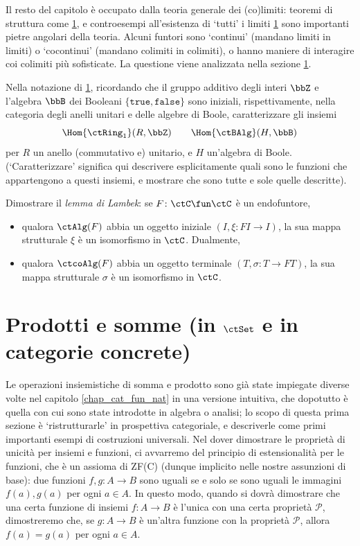 Il resto del capitolo è occupato dalla teoria generale dei (co)limiti: teoremi di struttura come \ref{}, e controesempi all'esistenza di `tutti' i limiti \ref{} sono importanti pietre angolari della teoria. Alcuni funtori sono `continui' (mandano limiti in limiti) o `cocontinui' (mandano colimiti in colimiti), o hanno maniere di interagire coi colimiti più sofisticate. La questione viene analizzata nella sezione \ref{}.
\begin{esercizi}
	\item \label{ex_21_1} Nella notazione di \ref{}, ricordando che il gruppo additivo degli interi \(\bbZ\) e l'algebra \(\bbB\) dei Booleani \(\{\texttt{true},\texttt{false}\}\) sono iniziali, rispettivamente, nella categoria degli anelli unitari e delle algebre di Boole, caratterizzare gli insiemi
	\[\Hom{\ctRing_1}(R,\bbZ) \qquad \Hom{\ctBAlg}(H,\bbB)\]
	per \(R\) un anello (commutativo e) unitario, e \(H\) un'algebra di Boole. (`Caratterizzare' significa qui descrivere esplicitamente quali sono le funzioni che appartengono a questi insiemi, e mostrare che sono tutte e sole quelle descritte).
	\item \label{ex_21_2} Dimostrare il \emph{lemma di Lambek}: se \(F \colon \ctC \fun\ctC\) è un endofuntore,
	\begin{itemize}
		\item qualora \(\ctAlg(F)\) abbia un oggetto iniziale \((I,\xi \colon FI \to I)\), la sua mappa strutturale \(\xi\) è un isomorfismo in \(\ctC\). Dualmente,
		\item qualora \(\ctcoAlg(F)\) abbia un oggetto terminale \((T,\sigma \colon T \to FT)\), la sua mappa strutturale \(\sigma\) è un isomorfismo in \(\ctC\).
	\end{itemize}
	\item \label{ex_21_3}
	\item \label{ex_21_4}
	\item \label{ex_21_5}
\end{esercizi}
\section{Prodotti e somme (in \(\ctSet\) e in categorie concrete)}
Le operazioni insiemistiche di somma e prodotto sono già state impiegate diverse volte nel capitolo \ref{chap_cat_fun_nat} in una versione intuitiva, che dopotutto è quella con cui sono state introdotte in algebra o analisi; lo scopo di questa prima sezione è `ristrutturarle' in prospettiva categoriale, e descriverle come primi importanti esempi di costruzioni universali. Nel dover dimostrare le proprietà di unicità per insiemi e funzioni, ci avvarremo del principio di estensionalità per le funzioni, che è un assioma di ZF(C) (dunque implicito nelle nostre assunzioni di base): due funzioni	\(f,g \colon A\to B\) sono uguali se e solo se sono uguali le immagini \(f(a),g(a)\) per ogni \(a\in A\). In questo modo, quando si dovrà dimostrare che una certa funzione di insiemi \(f \colon A\to B\) è l'unica con una certa proprietà \(\mathcal{P}\), dimostreremo che, se \(g \colon A \to B\) è un'altra funzione con la proprietà \(\mathcal{P}\), allora \(f(a)=g(a)\) per ogni \(a\in A\).
